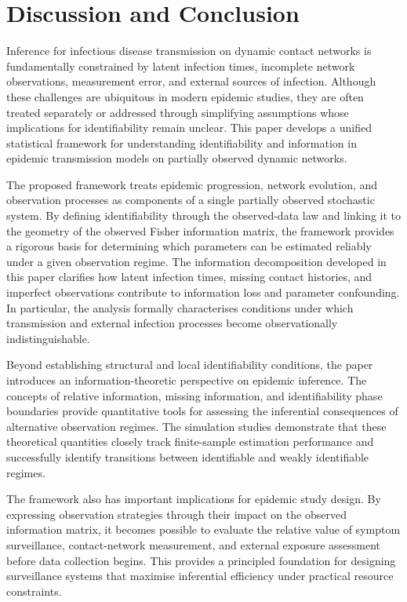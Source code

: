 \documentclass[10pt]{article}
\begin{document}
\section{Discussion and Conclusion}
\label{sec8:con}

Inference for infectious disease transmission on dynamic contact networks is fundamentally constrained by latent infection times, incomplete network observations, measurement error, and external sources of infection. Although these challenges are ubiquitous in modern epidemic studies, they are often treated separately or addressed through simplifying assumptions whose implications for identifiability remain unclear. This paper develops a unified statistical framework for understanding identifiability and information in epidemic transmission models on partially observed dynamic networks.

The proposed framework treats epidemic progression, network evolution, and observation processes as components of a single partially observed stochastic system. By defining identifiability through the observed-data law and linking it to the geometry of the observed Fisher information matrix, the framework provides a rigorous basis for determining which parameters can be estimated reliably under a given observation regime. The information decomposition developed in this paper clarifies how latent infection times, missing contact histories, and imperfect observations contribute to information loss and parameter confounding. In particular, the analysis formally characterises conditions under which transmission and external infection processes become observationally indistinguishable.

Beyond establishing structural and local identifiability conditions, the paper introduces an information-theoretic perspective on epidemic inference. The concepts of relative information, missing information, and identifiability phase boundaries provide quantitative tools for assessing the inferential consequences of alternative observation regimes. The simulation studies demonstrate that these theoretical quantities closely track finite-sample estimation performance and successfully identify transitions between identifiable and weakly identifiable regimes.

The framework also has important implications for epidemic study design. By expressing observation strategies through their impact on the observed information matrix, it becomes possible to evaluate the relative value of symptom surveillance, contact-network measurement, and external exposure assessment before data collection begins. This provides a principled foundation for designing surveillance systems that maximise inferential efficiency under practical resource constraints.
\end{document}

